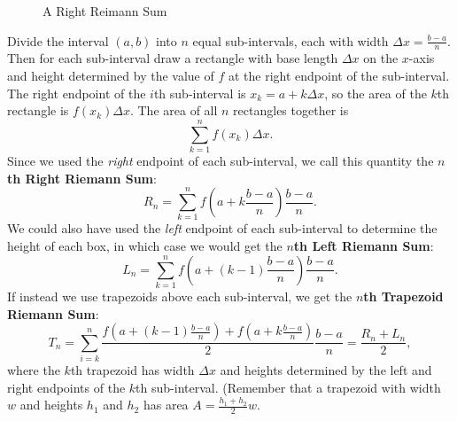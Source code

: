 \begin{figure}[h!]
{

}
\caption{A Right Reimann Sum}
\end{figure}

Divide the interval $(a,b)$ into $n$ equal sub-intervals, each with width $\Delta x= \frac{b-a}{n}$. Then for each sub-interval draw a rectangle with base length $\Delta x$ on the $x$-axis and height determined by the value of $f$ at the right endpoint of the sub-interval. The right endpoint of the $i$th sub-interval is $x_k=a+k\Delta x$, so the area of the $k$th rectangle is $f(x_k) \Delta x$. The area of all $n$ rectangles together is
$$\sum_{k=1}^{n}f(x_k)\Delta x.$$
Since we used the \textit{right} endpoint of each sub-interval, we call this quantity the \textbf{$n$th Right Riemann Sum}:
$$R_n=\sum_{k=1}^{n}f\left(a+k\frac{b-a}{n}\right)\frac{b-a}{n}.$$
We could also have used the \textit{left} endpoint of each sub-interval to determine the height of each box, in which case we would get the \textbf{$n$th Left Riemann Sum}:
$$L_n=\sum_{k=1}^{n}f\left(a+(k-1)\frac{b-a}{n}\right)\frac{b-a}{n}.$$
If instead we use trapezoids above each sub-interval, we get the \textbf{$n$th Trapezoid Riemann Sum}: 
$$T_n=\sum_{i=k}^{n}\frac{f\left(a+(k-1)\frac{b-a}{n}\right)+f\left(a+k\frac{b-a}{n}\right)}{2}\frac{b-a}{n}=\frac{R_n+L_n}{2},$$
where the $k$th trapezoid has width $\Delta x$ and heights determined by the left and right endpoints of the $k$th sub-interval. (Remember that a trapezoid with width $w$ and heights $h_1$ and $h_2$ has area $A=\frac{h_1+h_2}{2}w$. 

